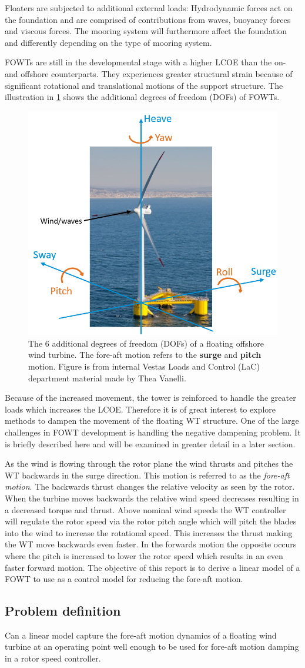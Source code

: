 Floaters are subjected to additional external loads: Hydrodynamic forces act on the foundation and are comprised of contributions from waves, buoyancy forces and viscous forces. The mooring system will furthermore affect the foundation and differently depending on the type of mooring system.

\smallskip
FOWTs are still in the developmental stage with a higher LCOE than the on- and offshore counterparts. They experiences greater structural strain because of significant rotational and translational motions of the support structure. The illustration in \cref{fig:fowt_coordinates} shows the additional degrees of freedom (DOFs) of FOWTs.
\begin{figure}[ht]
	\centering
	\includegraphics[width=0.55\linewidth]{Graphics/FOWTcoordinates.png}
	\caption{The 6 additional degrees of freedom (DOFs) of a floating offshore wind turbine. The fore-aft motion refers to the \textbf{surge} and \textbf{pitch} motion. Figure is from internal Vestas Loads and Control (LaC) department material made by Thea Vanelli.}
	\label{fig:fowt_coordinates}
\end{figure}
Because of the increased movement, the tower is reinforced to handle the greater loads which increases the LCOE. Therefore it is of great interest to explore methods to dampen the movement of the floating WT structure. One of the large challenges in FOWT development is handling the negative dampening problem. It is briefly described here and will be examined in greater detail in a later section.

\smallskip
As the wind is flowing through the rotor plane the wind thrusts and pitches the WT backwards in the surge direction. This motion is referred to as the \textit{fore-aft motion}. The backwards thrust changes the relative velocity as seen by the rotor. When the turbine moves backwards the relative wind speed decreases resulting in a decreased torque and thrust. Above nominal wind speeds the WT controller will regulate the rotor speed via the rotor pitch angle which will pitch the blades into the wind to increase the rotational speed. This increases the thrust making the WT move backwards even faster. In the forwards motion the opposite occurs where the pitch is increased to lower the rotor speed which results in an even faster forward motion. The objective of this report is to derive a linear model of a FOWT to use as a control model for reducing the fore-aft motion. 


\subsection{Problem definition} \label{sec:intro_problemdef}
Can a linear model capture the fore-aft motion dynamics of a floating wind turbine at an operating point well enough to be used for fore-aft motion damping in a rotor speed controller.